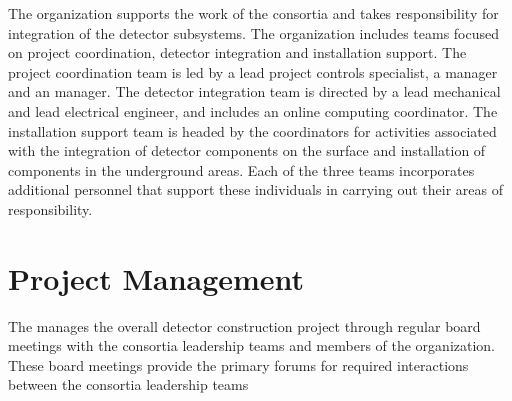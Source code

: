 
The  organization supports the work of the consortia and
takes responsibility for integration of the detector
subsystems.  The organization includes teams focused on project
coordination, detector integration and installation support.  The
project coordination team is led by a lead project controls
specialist, a  manager and an  manager.  The
detector integration team is directed by a lead mechanical and lead
electrical engineer, and includes an online computing coordinator.
The installation support team is headed by the coordinators for
activities associated with the integration of detector components on
the surface and installation of components in the underground areas.
Each of the three teams incorporates additional personnel that support
these individuals in carrying out their areas of responsibility.

\section{Project Management}
\label{sec:pm}


The  manages the overall detector construction
project through regular board meetings with the consortia leadership
teams and members of the  organization.  These
board meetings provide the primary forums for required interactions
between the consortia leadership teams

